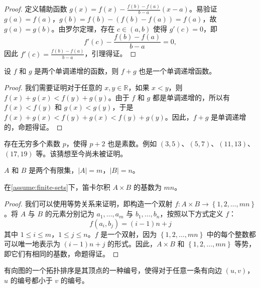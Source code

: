\begin{proof}
  定义辅助函数 $g(x) = f(x) - \frac{f(b)-f(a)}{b-a}(x-a)$。易验证 $g(a) = f(a)$，$g(b) = f(b) - (f(b)-f(a)) = f(a)$，故 $g(a) = g(b)$。由罗尔定理，存在 $c \in (a,b)$ 使得 $g'(c) = 0$，即
  \begin{equation*}
    f'(c) - \frac{f(b)-f(a)}{b-a} = 0,
  \end{equation*}
  因此 $f'(c) = \frac{f(b)-f(a)}{b-a}$，引理得证。
\end{proof}

\begin{prop}
  设 $f$ 和 $g$ 是两个单调递增的函数，则 $f+g$ 也是一个单调递增函数。
\end{prop}

\begin{proof}
  我们需要证明对于任意的 $x,y \in \mathbb{R}$，如果 $x < y$，则 $f(x)+g(x) < f(y)+g(y)$。由于 $f$ 和 $g$ 都是单调递增的，所以有 $f(x) < f(y)$ 和 $g(x) < g(y)$，于是 $f(x)+g(x) < f(y)+g(x) < f(y)+g(y)$。因此，$f+g$ 是单调递增的，命题得证。
\end{proof}

\begin{conj}[孪生素数猜想]
  存在无穷多个素数 $p$，使得 $p+2$ 也是素数。例如 $(3,5)$、$(5,7)$、$(11,13)$、$(17,19)$ 等。该猜想至今尚未被证明。
\end{conj}

\begin{assume}\label{assume:finite-sets}
  $A$ 和 $B$ 是两个有限集，$|A| = m$，$|B| = n$。
\end{assume}

\begin{prop}
  在\cref{assume:finite-sets}下，笛卡尔积 $A \times B$ 的基数为 $mn$。
\end{prop}

\begin{proof}
  我们可以使用等势关系来证明，即构造一个双射 $f: A \times B \rightarrow \left\{1,2,\dots,mn\right\}$。将 $A$ 与 $B$ 的元素分别记为 $a_1, \dots, a_m$ 与 $b_1, \dots, b_n$，按照以下方式定义 $f$：
  \begin{equation}
    f(a_i,b_j)=(i-1)n+j
  \end{equation}
  其中 $1 \leq i \leq m$，$1 \leq j \leq n$。$f$ 是一个双射，因为 $\left\{1,2,\dots,mn\right\}$ 中的每个整数都可以唯一地表示为 $(i-1)n + j$ 的形式。因此，$A \times B$ 和 $\left\{1,2,\dots,mn\right\}$ 等势，即它们有相同的基数，命题得证。
\end{proof}

\begin{dfn}
  有向图的一个拓扑排序是其顶点的一种编号，使得对于任意一条有向边 $(u,v)$，$u$ 的编号都小于 $v$ 的编号。
\end{dfn}

